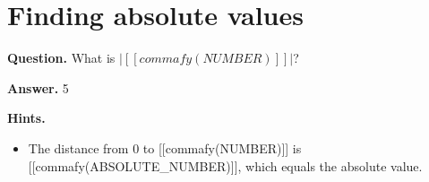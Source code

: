 \documentclass{article}
\begin{document}
\section*{Finding absolute values}
\textbf{Question.} What is $\lvert [[commafy(NUMBER)]] \rvert$?

\textbf{Answer.} 5

\textbf{Hints.}
\begin{itemize}
  \item The distance from 0 to [[commafy(NUMBER)]] is [[commafy(ABSOLUTE\_NUMBER)]], which equals the absolute value.
\end{itemize}
\end{document}
